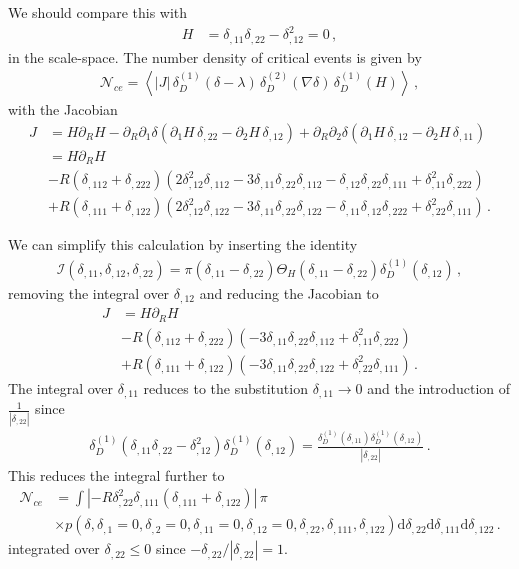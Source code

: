 \documentclass[a4paper, 11pt]{article}
\begin{document}
\begin{framed}
\noindent We should compare this with
\begin{align}
H &= \delta_{,11} \delta_{,22} - \delta_{,12}^2=0\,,
\end{align}
in the scale-space. The number density of critical events is given by
\begin{align}
\mathcal{N}_{ce} = 
\left\langle \left|J\right| \,
\delta_D^{(1)}(\delta-\lambda)\,
\delta_D^{(2)}(\nabla \delta )\,
\delta_D^{(1)}(H)
\right\rangle\,,
\end{align}
with the Jacobian 
\begin{align}
J 
&= H \partial_R H
-\partial_R \partial_1 \delta( 
\partial_1 H \, \delta_{,22} - \partial_2 H \, \delta_{,12}    ) 
+ 
\partial_R \partial_2 \delta (
 \partial_1 H \, \delta_{,12}
 -
\partial_2  H \,  \delta_{,11} )\\
&= H \partial_R H\\
&-R (\delta_{,112} + \delta_{,222})(2\delta_{,12}^2\delta_{,112} -3 \delta_{,11}\delta_{,22}\delta_{,112}-\delta_{,12}\delta_{,22}\delta_{,111} + \delta_{,11}^2 \delta_{,222})\\
&+R (\delta_{,111}+\delta_{,122})(2\delta_{,12}^2\delta_{,122} -3\delta_{,11} \delta_{,22}\delta_{,122}-\delta_{,11}\delta_{,12}\delta_{,222} + \delta_{,22}^2 \delta_{,111})\,.
\end{align}

We can simplify this calculation by inserting the identity
\begin{align}
\mathcal{I}(\delta_{,11},\delta_{,12},\delta_{,22}) = \pi (\delta_{,11}-\delta_{,22}) \Theta_H(\delta_{,11}-\delta_{,22})\delta_D^{(1)}(\delta_{,12})\,,
\end{align}
removing the integral over $\delta_{,12}$ and reducing the Jacobian to
\begin{align}
J 
&= H \partial_R H\\
&-R (\delta_{,112} + \delta_{,222})(-3 \delta_{,11}\delta_{,22}\delta_{,112} + \delta_{,11}^2 \delta_{,222})\\
&+R (\delta_{,111}+\delta_{,122})( -3\delta_{,11} \delta_{,22}\delta_{,122}+ \delta_{,22}^2 \delta_{,111})\,.
\end{align}
The integral over $\delta_{,11}$ reduces to the substitution $\delta_{,11}\to 0$ and the introduction of $\frac{1}{|\delta_{,22}|}$ since 
\begin{align}
\delta_D^{(1)}(\delta_{,11} \delta_{,22} - \delta_{,12}^2)\delta_D^{(1)}(\delta_{,12})=\frac{\delta_D^{(1)}(\delta_{,11})\delta_D^{(1)}(\delta_{,12})}{|\delta_{,22}|}\,.
\end{align}
This reduces the integral further to
\begin{align}
\mathcal{N}_{ce} &= 
\int \left|-R\delta_{,22}^2\delta_{,111}(\delta_{,111}+\delta_{,122})\right| \, \pi\, \\
&\times p(\delta,\delta_{,1}=0,\delta_{,2}=0,\delta_{,11}=0,\delta_{,12}=0,\delta_{,22},\delta_{,111},\delta_{,122})
\mathrm{d}\delta_{,22}\mathrm{d}\delta_{,111}\mathrm{d}\delta_{,122}\,.
\end{align}
integrated over $\delta_{,22}\leq 0$ since $-\delta_{,22}/|\delta_{,22}| = 1$.
\end{framed}
\end{document}
